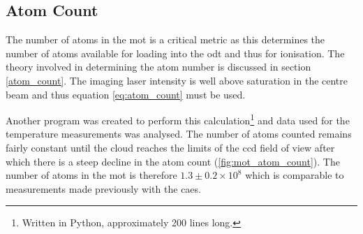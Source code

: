 \subsection{Atom Count}
\label{mot_atom_count}
The number of atoms in the \gls{mot} is a critical metric as this determines the number of atoms available for loading into the \gls{odt} and thus for ionisation. The theory involved in determining the atom number is discussed in section \ref{atom_count}. The imaging laser intensity is well above saturation in the centre beam and thus equation \ref{eq:atom_count} must be used.

Another program was created to perform this calculation\footnote{Written in Python, approximately 200 lines long.} and data used for the temperature measurements was analysed. The number of atoms counted remains fairly constant until the cloud reaches the limits of the \gls{ccd} field of view after which there is a steep decline in the atom count (\ref{fig:mot_atom_count}). The number of atoms in the \gls{mot} is therefore $1.3 \pm0.2\times10^8$ which is comparable to measurements made previously with the \gls{caes}\cite{sheludko_shaped_2010}.

